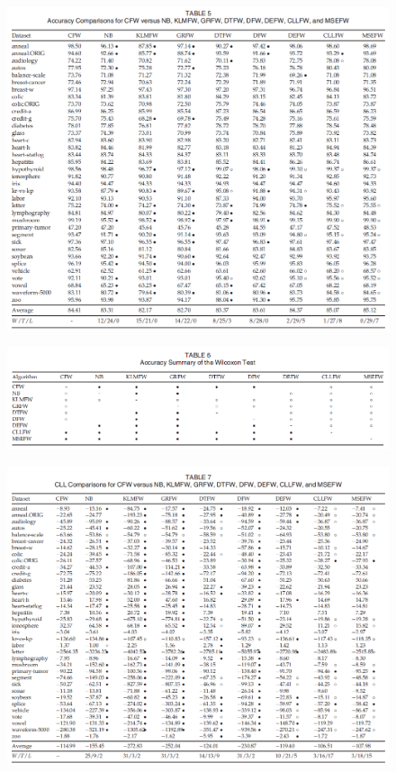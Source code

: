 \documentclass[12pt, a4paper]{article}
\begin{document}
\begin{figure}
    \centering
    \includegraphics[width=\linewidth]{images/article2/table5.png}
    \caption{}
    \label{a2_table5}
\end{figure}

\begin{figure}
    \centering
    \includegraphics[width=\linewidth]{images/article2/table6.png}
    \caption{}
    \label{a2_table6}
\end{figure}

\clearpage

\begin{figure}
    \centering
    \includegraphics[width=\linewidth]{images/article2/table7.png}
    \caption{}
    \label{a2_table7}
\end{figure}
\end{document}
